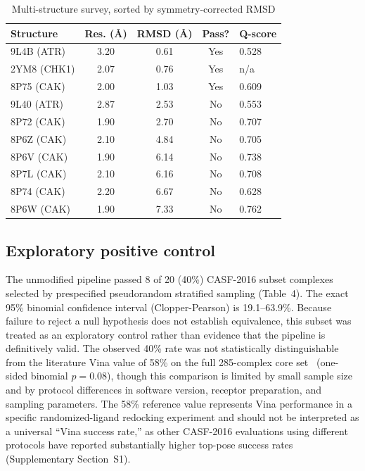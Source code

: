 \documentclass[global,twocolumn]{svjour}
\newcommand{\st}{\footnotesize\setlength{\tabcolsep}{3pt}}
\begin{document}
\begin{table}[t]
\centering
\caption{Multi-structure survey, sorted by symmetry-corrected RMSD}
\label{tab:survey}
\st
\begin{tabular}{lcccl}
\toprule
Structure & Res. (\AA{}) & RMSD (\AA{}) & Pass? & Q-score \\
\midrule
9L4B (ATR)  & 3.20 & 0.61 & Yes & 0.528 \\
2YM8 (CHK1) & 2.07 & 0.76 & Yes & n/a \\
8P75 (CAK)  & 2.00 & 1.03 & Yes & 0.609 \\
9L40 (ATR)  & 2.87 & 2.53 & No  & 0.553 \\
8P72 (CAK)  & 1.90 & 2.70 & No  & 0.707 \\
8P6Z (CAK)  & 2.10 & 4.84 & No  & 0.705 \\
8P6V (CAK)  & 1.90 & 6.14 & No  & 0.738 \\
8P7L (CAK)  & 2.10 & 6.16 & No  & 0.708 \\
8P74 (CAK)  & 2.20 & 6.67 & No  & 0.628 \\
8P6W (CAK)  & 1.90 & 7.33 & No  & 0.762 \\
\bottomrule
\end{tabular}
\end{table}

\subsection{Exploratory positive control}

The unmodified pipeline passed 8 of 20 (40\%) CASF-2016 subset complexes
selected by prespecified pseudorandom stratified sampling (Table~4). The exact
95\% binomial confidence interval (Clopper-Pearson) is 19.1--63.9\%. Because
failure to reject a null hypothesis does not establish equivalence, this
subset was treated as an exploratory control rather than evidence that the
pipeline is definitively valid. The observed 40\% rate was not statistically
distinguishable from the literature Vina value of 58\% on the full 285-complex
core set~\cite{zhang2023} (one-sided binomial $p=0.08$), though this
comparison is limited by small sample size and by protocol differences in
software version, receptor preparation, and sampling parameters. The 58\%
reference value represents Vina performance in a specific randomized-ligand
redocking experiment and should not be interpreted as a universal ``Vina
success rate,'' as other CASF-2016 evaluations using different protocols have
reported substantially higher top-pose success rates (Supplementary
Section~S1).
\end{document}
